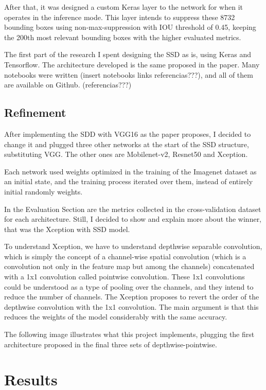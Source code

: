 \documentclass[11pt, a4paper, twocolumn]{article}
\begin{document}
After that, it was designed a custom Keras layer to the network for when it operates in the inference mode. This layer intends to suppress these 8732 bounding boxes using non-max-suppression with IOU threshold of 0.45, keeping the 200th most relevant bounding boxes with the higher evaluated metrics.

The first part of the research I spent designing the SSD as is, using Keras and Tensorflow. The architecture developed is the same proposed in the paper. Many notebooks were written (insert notebooks links referencias???), and all of them are available on Github. (referencias???)

\subsection{Refinement}

After implementing the SDD with VGG16 as the paper proposes, I decided to change it and plugged three other networks at the start of the SSD structure, substituting VGG. The other ones are Mobilenet-v2, Resnet50 and Xception.

Each network used weights optimized in the training of the Imagenet dataset as an initial state, and the training process iterated over them, instead of entirely initial randomly weights.

In the Evaluation Section are the metrics collected in the cross-validation dataset for each architecture. Still, I decided to show and explain more about the winner, that was the Xception with SSD model.

To understand Xception, we have to understand depthwise separable convolution, which is simply the concept of a channel-wise spatial convolution (which is a convolution not only in the feature map but among the channels) concatenated with a 1x1 convolution called pointwise convolution. These 1x1 convolutions could be understood as a type of pooling over the channels, and they intend to reduce the number of channels. The Xception proposes to revert the order of the depthwise convolution with the 1x1 convolution. The main argument is that this reduces the weights of the model considerably with the same accuracy.

The following image illustrates what this project implements, plugging the first architecture proposed in the final three sets of depthwise-pointwise.

\section{Results}
\end{document}
